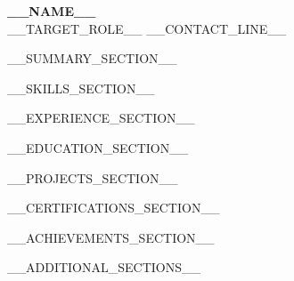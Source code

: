 \documentclass[10pt,letterpaper]{article}
\begin{document}
\begin{center}
    {\LARGE \textbf{__NAME__}} \\ \vspace{2pt}
    __TARGET_ROLE__
    \small
    __CONTACT_LINE__
\end{center}

\vspace{-4pt}

__SUMMARY_SECTION__

__SKILLS_SECTION__

__EXPERIENCE_SECTION__

__EDUCATION_SECTION__

__PROJECTS_SECTION__

__CERTIFICATIONS_SECTION__

__ACHIEVEMENTS_SECTION__

__ADDITIONAL_SECTIONS__
\end{document}
